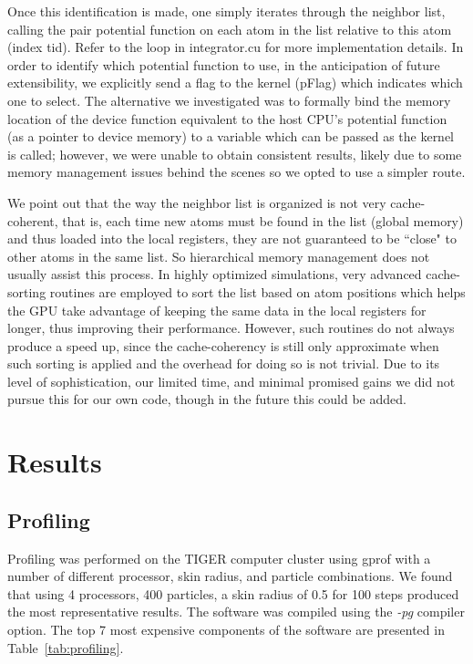 \documentclass[12pt]{article}
\begin{document}
Once this identification is made, one simply iterates through the neighbor list, calling the pair potential function on each atom in the list relative to this atom (index tid).  Refer to the loop in integrator.cu for more implementation details.  In order to identify which potential function to use, in the anticipation of future extensibility, we explicitly send a flag to the kernel (pFlag) which indicates which one to select.  The alternative we investigated was to formally bind the memory location of the device function equivalent to the host CPU's potential function (as a pointer to device memory) to a variable which can be passed as the kernel is called; however, we were unable to obtain consistent results, likely due to some memory management issues behind the scenes so we opted to use a simpler route.

We point out that the way the neighbor list is organized is not very cache-coherent, that is, each time new atoms must be found in the list (global memory) and thus loaded into the local registers, they are not guaranteed to be ``close" to other atoms in the same list.  So hierarchical memory management does not usually assist this process.  In highly optimized simulations, very advanced cache-sorting routines are employed to sort the list based on atom positions which helps the GPU take advantage of keeping the same data in the local registers for longer, thus improving their performance.  However, such routines do not always produce a speed up, since the cache-coherency is still only approximate when such sorting is applied and the overhead for doing so is not trivial.  Due to its level of sophistication, our limited time,  and minimal promised gains we did not pursue this for our own code, though in the future this could be added.

\section{Results}

\subsection{Profiling}

Profiling was performed on the TIGER computer cluster using gprof with a number of different processor, skin radius, and particle combinations. We found that using 4 processors, 400 particles, a skin radius of 0.5 for 100 steps produced the most representative results. The software was compiled using the \textit{-pg} compiler option. The top 7 most expensive components of the software are presented in Table~\ref{tab:profiling}.
\end{document}
